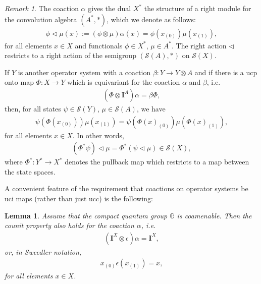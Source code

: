 \documentclass{amsart}
\theoremstyle{plain}
\newtheorem{lemma}[theorem]{Lemma}
\theoremstyle{definition}
\theoremstyle{remark}
\newtheorem{remark}[theorem]{Remark}
\begin{document}
	\begin{remark}\label{rmk:Module-structure-on-states-from-coaction}
		The coaction $\alpha$ gives the dual $X^*$ the structure of a right module for the convolution algebra $(A^*,*)$, which we denote as follows:
		\begin{align}
			\phi \lhd \mu (x) := (\phi \otimes \mu) \alpha(x) = \phi(x_{(0)}) \mu(x_{(1)}),
		\end{align}
		for all elements $x \in X$ and functionals $\phi \in X^*$, $\mu \in A^*$. 
		The right action $\lhd$ restricts to a right action of the semigroup $(\mathcal{S}(A),*)$ on $\mathcal{S}(X)$.
		
		If $Y$ is another operator system with a coaction $\beta : Y \rightarrow Y \otimes A$ and if there is a ucp onto map $\Phi : X \rightarrow Y$ which is equivariant for the coaction $\alpha$ and $\beta$, i.e.
		\begin{align}
			(\Phi \otimes \mathbf{I}^A) \alpha = \beta \Phi,
		\end{align}
		then, for all states $\psi \in \mathcal{S}(Y)$, $\mu \in \mathcal{S}(A)$, we have
		\begin{align}\label{eqn:Pullback-convolved-state-Sweedler}
			\psi(\Phi(x_{(0)})) \mu(x_{(1)}) = \psi(\Phi(x)_{(0)}) \mu(\Phi(x)_{(1)}),
		\end{align}
		for all elements $x \in X$.
		In other words,
		\begin{align}
			(\Phi^*\psi) \lhd \mu = \Phi^*(\psi \lhd \mu) \in \mathcal{S}(X),
		\end{align}
		where $\Phi^* : Y^* \rightarrow X^*$ denotes the pullback map which restricts to a map between the state spaces.
	\end{remark}
	
	A convenient feature of the requirement that coactions on operator systems be uci maps (rather than just ucc) is the following:
	
	\begin{lemma}\label{lem:Counit-Property-Operator-System}
		Assume that the compact quantum group $\mathbb{G}$ is coamenable.
		Then the \emph{counit property} also holds for the coaction $\alpha$, i.e.
		\begin{align}
			(\mathbf{I}^X \otimes \epsilon) \alpha = \mathbf{I}^X,
		\end{align}
		or, in Sweedler notation,
		\begin{align}
			x_{(0)} \epsilon(x_{(1)}) = x,
		\end{align}
		for all elements $x \in X$.
	\end{lemma}
	
\end{document}
